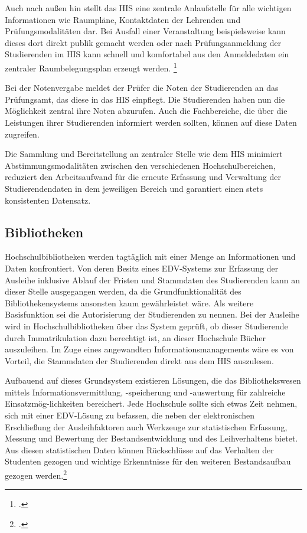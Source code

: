 Auch nach außen hin stellt das HIS eine zentrale Anlaufstelle für alle wichtigen 
Informationen wie Raumpläne, Kontaktdaten der Lehrenden und Prüfungsmodalitäten dar. 
Bei Ausfall einer Veranstaltung beispielsweise kann dieses dort direkt publik gemacht 
werden oder nach Prüfungsanmeldung der Studierenden im HIS kann schnell und 
komfortabel aus den Anmeldedaten ein zentraler Raumbelegungsplan erzeugt werden.
\footcite{evalag_eckpunkte_2012}

Bei der Notenvergabe meldet der Prüfer die Noten der Studierenden an das Prüfungsamt, das 
diese in das HIS einpflegt. Die Studierenden haben nun die Möglichkeit zentral ihre Noten 
abzurufen. Auch die Fachbereiche, die über die Leistungen ihrer Studierenden informiert 
werden sollten, können auf diese Daten zugreifen.

Die Sammlung und Bereitstellung an zentraler Stelle wie dem HIS minimiert 
Abstimmungsmodalitäten zwischen den verschiedenen Hochschulbereichen, reduziert den 
Arbeitsaufwand für die erneute Erfassung und Verwaltung der Studierendendaten in dem 
jeweiligen Bereich und garantiert einen stets konsistenten Datensatz.


\subsection{Bibliotheken}
Hochschulbibliotheken werden tagtäglich mit einer Menge an Informationen und Daten 
konfrontiert. Von deren Besitz eines EDV-Systems zur Erfassung der Ausleihe inklusive Ablauf 
der Fristen und Stammdaten des Studierenden kann an dieser Stelle ausgegangen werden, da 
die Grundfunktionalität des Bibliothekensystems ansonsten kaum gewährleistet wäre. Als 
weitere Basisfunktion sei die Autorisierung der Studierenden zu nennen. Bei der Ausleihe 
wird in Hochschulbibliotheken über das System geprüft, ob dieser Studierende durch 
Immatrikulation dazu berechtigt ist, an dieser Hochschule Bücher auszuleihen. 
Im Zuge eines angewandten Informationsmanagements wäre es von Vorteil, die Stammdaten der Studierenden direkt aus dem HIS auszulesen. 

Aufbauend auf dieses Grundsystem existieren Lösungen, die das Bibliothekswesen mittels 
Informationsvermittlung, -speicherung und -auswertung für zahlreiche 
Einsatzmög-lichkeiten bereichert. Jede Hochschule sollte sich etwas Zeit nehmen, sich mit 
einer EDV-Lösung zu befassen, die neben der elektronischen Erschließung der 
Ausleihfaktoren auch Werkzeuge zur statistischen Erfassung, Messung und Bewertung der 
Bestandsentwicklung und des Leihverhaltens bietet. Aus diesen statistischen Daten können 
Rückschlüsse auf das Verhalten der Studenten gezogen und wichtige Erkenntnisse für den 
weiteren Bestandsaufbau gezogen werden.\footcite[9 ff.]{merkle_aufbau_2004}

